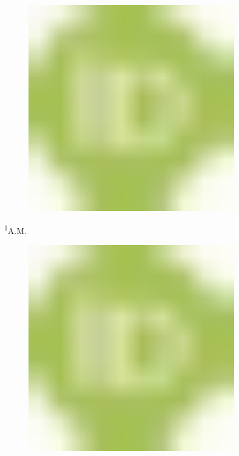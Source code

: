 \begin{figure}[H]
	\centering
	\includegraphics[width=0.8\textwidth]{media/chem2/image1}
	\caption*{}
\end{figure}

\textsuperscript{1}A.M.
\begin{figure}[H]
	\centering
	\includegraphics[width=0.8\textwidth]{media/chem2/image1}
	\caption*{}
\end{figure}


